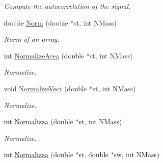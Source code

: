 \begin{DoxyCompactItemize}
\begin{DoxyCompactList}\small\item\em Compute the autocorrelation of the signal. \end{DoxyCompactList}\item 
double \hyperlink{classMatematica_a842d80157ade9075dce41b8b9f4bb4f3}{Norm} (double $\ast$st, int N\+Mass)\hypertarget{classMatematica_a842d80157ade9075dce41b8b9f4bb4f3}{}\label{classMatematica_a842d80157ade9075dce41b8b9f4bb4f3}

\begin{DoxyCompactList}\small\item\em Norm of an array. \end{DoxyCompactList}\item 
int \hyperlink{classMatematica_ac3425ea4b3f1bc9999c7b6442b106ebe}{Normalize\+Area} (double $\ast$st, int N\+Mass)\hypertarget{classMatematica_ac3425ea4b3f1bc9999c7b6442b106ebe}{}\label{classMatematica_ac3425ea4b3f1bc9999c7b6442b106ebe}

\begin{DoxyCompactList}\small\item\em Normalize. \end{DoxyCompactList}\item 
void \hyperlink{classMatematica_a30066e752b4f5504770d8d8c5687972a}{Normalize\+Vect} (double $\ast$st, int N\+Mass)\hypertarget{classMatematica_a30066e752b4f5504770d8d8c5687972a}{}\label{classMatematica_a30066e752b4f5504770d8d8c5687972a}

\begin{DoxyCompactList}\small\item\em Normalize. \end{DoxyCompactList}\item 
int \hyperlink{classMatematica_aa51fbe747c2dcd8d72980b9624be93a1}{Normalizza} (double $\ast$st, int N\+Mass)\hypertarget{classMatematica_aa51fbe747c2dcd8d72980b9624be93a1}{}\label{classMatematica_aa51fbe747c2dcd8d72980b9624be93a1}

\begin{DoxyCompactList}\small\item\em Normalize. \end{DoxyCompactList}\item 
int \hyperlink{classMatematica_a3221d7079785ecb693e84532d784c302}{Normalizza} (double $\ast$st, double $\ast$sw, int N\+Mass)\hypertarget{classMatematica_a3221d7079785ecb693e84532d784c302}{}\label{classMatematica_a3221d7079785ecb693e84532d784c302}


\end{DoxyCompactItemize}
